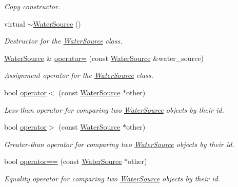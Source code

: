 \begin{DoxyCompactItemize}
\begin{DoxyCompactList}\small\item\em Copy constructor. \end{DoxyCompactList}\item 
virtual \mbox{\hyperlink{classWaterSource_aa3b9261264152782c3115d2f563f1caf}{$\sim$\+Water\+Source}} ()
\begin{DoxyCompactList}\small\item\em Destructor for the {\ttfamily \mbox{\hyperlink{classWaterSource}{Water\+Source}}} class. \end{DoxyCompactList}\item 
\mbox{\hyperlink{classWaterSource}{Water\+Source}} \& \mbox{\hyperlink{classWaterSource_af10a33e286cf44b362984ff8d8053c91}{operator=}} (const \mbox{\hyperlink{classWaterSource}{Water\+Source}} \&water\+\_\+source)
\begin{DoxyCompactList}\small\item\em Assignment operator for the {\ttfamily \mbox{\hyperlink{classWaterSource}{Water\+Source}}} class. \end{DoxyCompactList}\item 
bool \mbox{\hyperlink{classWaterSource_accb044cc78f9a444ca18bf7283b5b596}{operator$<$}} (const \mbox{\hyperlink{classWaterSource}{Water\+Source}} $\ast$other)
\begin{DoxyCompactList}\small\item\em Less-\/than operator for comparing two {\ttfamily \mbox{\hyperlink{classWaterSource}{Water\+Source}}} objects by their {\ttfamily id}. \end{DoxyCompactList}\item 
bool \mbox{\hyperlink{classWaterSource_a9db800769891e1f49d74a78298f4dac1}{operator$>$}} (const \mbox{\hyperlink{classWaterSource}{Water\+Source}} $\ast$other)
\begin{DoxyCompactList}\small\item\em Greater-\/than operator for comparing two {\ttfamily \mbox{\hyperlink{classWaterSource}{Water\+Source}}} objects by their {\ttfamily id}. \end{DoxyCompactList}\item 
bool \mbox{\hyperlink{classWaterSource_af25e06ec954898f3392cb125d2f2c2ad}{operator==}} (const \mbox{\hyperlink{classWaterSource}{Water\+Source}} $\ast$other)
\begin{DoxyCompactList}\small\item\em Equality operator for comparing two {\ttfamily \mbox{\hyperlink{classWaterSource}{Water\+Source}}} objects by their {\ttfamily id}. \end{DoxyCompactList}\item 

\end{DoxyCompactItemize}
